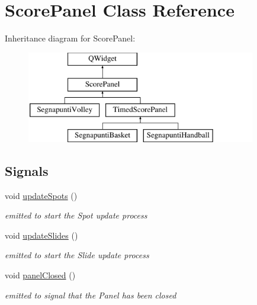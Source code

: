 \hypertarget{classScorePanel}{}\section{Score\+Panel Class Reference}
\label{classScorePanel}
Inheritance diagram for Score\+Panel\+:\begin{figure}[H]
\begin{center}
\leavevmode
\includegraphics[height=4.000000cm]{d3/dba/classScorePanel}
\end{center}
\end{figure}
\subsection*{Signals}
\begin{DoxyCompactItemize}
\item 
\mbox{\label{classScorePanel_aa339aecc1d8808e0cbbf78e4d3cfd195}} 
void \mbox{\hyperlink{classScorePanel_aa339aecc1d8808e0cbbf78e4d3cfd195}{update\+Spots}} ()
\begin{DoxyCompactList}\small\item\em emitted to start the Spot update process \end{DoxyCompactList}\item 
\mbox{\label{classScorePanel_a8b9256b99863d98cd2f7546aafa4c39f}} 
void \mbox{\hyperlink{classScorePanel_a8b9256b99863d98cd2f7546aafa4c39f}{update\+Slides}} ()
\begin{DoxyCompactList}\small\item\em emitted to start the Slide update process \end{DoxyCompactList}\item 
\mbox{\label{classScorePanel_a665992ebbd2a46625fd713593d2393a6}} 
void \mbox{\hyperlink{classScorePanel_a665992ebbd2a46625fd713593d2393a6}{panel\+Closed}} ()
\begin{DoxyCompactList}\small\item\em emitted to signal that the Panel has been closed \end{DoxyCompactList}\end{DoxyCompactItemize}

